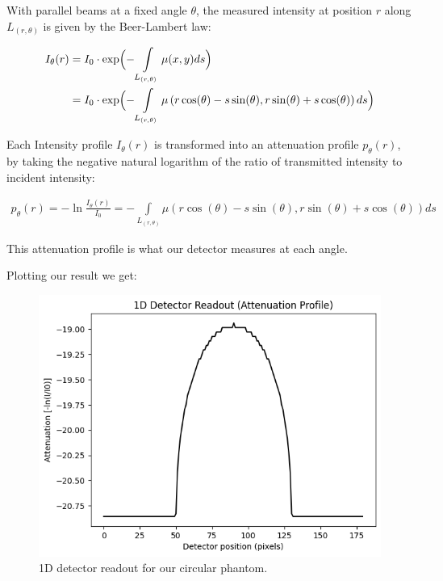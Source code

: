 \documentclass{article}
\theoremstyle{definition}
\begin{document}
With parallel beams at a fixed angle $\theta$, the measured intensity at position $r$ along $L_{(r,\theta)}$ is given by the Beer-Lambert law:

\begin{align}
I_{\theta}(r) &= I_0 \cdot \exp\Bigl({-\int\limits_{L_{(r,\theta)}} \mu (x,y) ds} \Bigr) \\
& = I_0 \cdot \exp\Bigl({-\int\limits_{L_{(r,\theta)}} \mu \left(r \cos(\theta) - s \sin(\theta),r \sin(\theta) + s \cos(\theta)\right) ds} \Bigr) 
\end{align}

Each Intensity profile $I_\theta (r)$ is transformed into an attenuation profile $p_\theta (r)$, by taking the negative natural logarithm of the ratio of transmitted intensity to incident intensity:

\begin{align}
p_\theta (r) = - \ln \frac{I_\theta (r)}{I_0} = -\int\limits_{L_{(r,\theta)}} \mu \left(r \cos(\theta) - s \sin(\theta),r \sin(\theta) + s \cos(\theta)\right) ds
\end{align}

This attenuation profile is what our detector measures at each angle.

Plotting our result we get:
\begin{figure}[H]
	\includegraphics[scale=0.6]{detectorreadout.png}
	\caption{1D detector readout for our circular phantom.}
	\label{fig:detector1d}
\end{figure}
\end{document}
